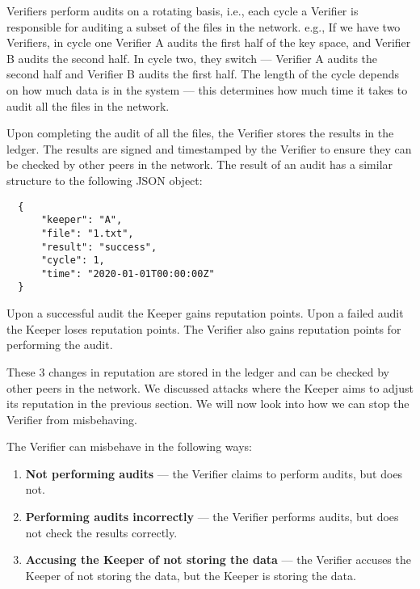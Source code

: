 Verifiers perform audits on a rotating basis, i.e., each cycle a Verifier is responsible for auditing
a subset of the files in the network.
e.g., If we have two Verifiers, in cycle one Verifier A audits the first half of the key space,
and Verifier B audits the second half.
In cycle two, they switch --- Verifier A audits the second half and Verifier B audits the first half.
The length of the cycle depends on how much data is in the system --- this determines
how much time it takes to audit all the files in the network.

Upon completing the audit of all the files, the Verifier stores the results in the ledger.
The results are signed and timestamped by the Verifier to
ensure they can be checked by other peers in the network.
The result of an audit has a similar structure to the following JSON object:
\begin{verbatim}
  {
      "keeper": "A",
      "file": "1.txt",
      "result": "success",
      "cycle": 1,
      "time": "2020-01-01T00:00:00Z"
  }
\end{verbatim}

Upon a successful audit the Keeper gains reputation points.
Upon a failed audit the Keeper loses reputation points.
The Verifier also gains reputation points for performing the audit.

These 3 changes in reputation are stored in the ledger and can be checked by other peers in the network.
We discussed attacks where the Keeper aims to adjust its reputation in the previous section.
We will now look into how we can stop the Verifier from misbehaving.

The Verifier can misbehave in the following ways:
\begin{enumerate}
    \item \textbf{Not performing audits} --- the Verifier claims to perform audits, but does not.
    \item \textbf{Performing audits incorrectly} --- the Verifier performs audits, but does not check the results correctly.
    \item \textbf{Accusing the Keeper of not storing the data} --- the Verifier accuses the Keeper of not storing the data, but the Keeper is storing the data.
\end{enumerate}

